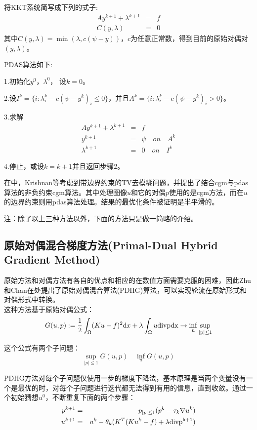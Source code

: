 \documentclass[a4paper,12pt]{article}
\begin{document}
将KKT系统简写成下列的式子:
\begin{eqnarray*}
Ay^{k+1}+\lambda^{k+1}&=&f\\
C(y,\lambda)&=&0
\end{eqnarray*}
其中$C(y,\lambda)=\min(\lambda,c(\psi-y))$，$c$为任意正常数，得到目前的原始对偶对$(y,\lambda)$。

PDAS算法如下:

1.初始化$y^0$，$\lambda^0$， 设$k=0$。

2.设$I^k=\{i:\lambda^k_i-c(\psi-y^k)_i\leq0 \}$，并且$A^k=\{i:\lambda^k_i-c(\psi-y^k)_i>0\}$。

3.求解
\begin{eqnarray*}
Ay^{k+1}+\lambda^{k+1}&=&f\\
y^{k+1}&=&\psi \quad on \quad A^k\\
\lambda^{k+1}&=&0 \quad on \quad I^k
\end{eqnarray*}

4.停止，或设$k=k+1$并且返回步骤2。

在\cite{Krishnan:2007nn}中，Krishnan等考虑到带边界约束的TV去模糊问题，并提出了结合cgm与pdas算法的非负约束cgm算法。其中处理图像$u$和它的对偶$p$使用的是cgm方法，而在$u$的边界约束则用pdas算法处理。结果的最优化条件被证明是半平滑的。

注：除了以上三种方法以外，下面的方法只是做一简略的介绍。

\subsection{原始对偶混合梯度方法(Primal-Dual Hybrid Gradient Method)}

原始方法和对偶方法有各自的优点和相应的在数值方面需要克服的困难，因此Zhu和Chan在\cite{Zhu:2008pd}处提出了原始对偶混合算法(PDHG)算法，可以实现轮流在原始形式和对偶形式中转换。\\
这种方法基于原始对偶公式：
\begin{displaymath}
G(u,p):=\frac{1}{2}\int_{\Omega}(Ku-f)^2\mathrm{d} x+\lambda\int_{\Omega}u\rm div p\mathrm{d} x\rightarrow \inf_u\sup_{|p|\leq1}
\end{displaymath}

这个公式有两个子问题：
\begin{displaymath}
\sup_{|p|\leq1}G(u,p) \quad \inf_u G(u,p)
\end{displaymath}

PDHG方法对每个子问题仅使用一步的梯度下降法，基本原理是当两个变量没有一个是最优的时，对每个子问题进行迭代都无法得到有用的信息，直到收敛。通过一个初始猜想$u^0$，不断重复下面的两个步骤：
\begin{eqnarray*}
p^{k+1}&=&p_{|p|\leq1}(p^k-\tau_k\nabla u^k)\\
u^{k+1}&=&u^k-\theta_k(K^T(Ku^k-f)+\lambda \rm div p^{k+1})
\end{eqnarray*}
\end{document}
